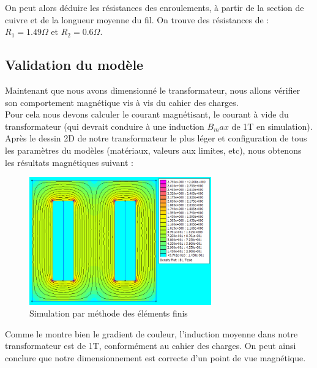 On peut alors déduire les résistances des enroulements, à partir de la section de cuivre et de la longueur moyenne du fil. On trouve des résistances de : $R_1 = 1.49\Omega$ et $R_2 = 0.6\Omega$.\\

\newpage
\subsection{Validation du modèle}
Maintenant que nous avons dimensionné le transformateur, nous allons vérifier son comportement magnétique vis à vis du cahier des charges.\\
Pour cela nous devons calculer le courant magnétisant, le courant à vide du transformateur (qui devrait conduire à une induction $B_max$ de 1T en simulation).\\

Après le dessin 2D de notre transformateur le plus léger et configuration de tous les paramètres du modèles (matériaux, valeurs aux limites, etc), nous obtenons les résultats magnétiques suivant :\\

\begin{figure}[h]
	\begin{center}
	\includegraphics[width=0.7\textwidth]{images/TP1_FEMM_validation}
	\caption{Simulation par méthode des éléments finis}\label{img:FEMMvalidation}
	\end{center}
\end{figure}
\FloatBarrier 

Comme le montre bien le gradient de couleur, l'induction moyenne dans notre transformateur est de 1T, conformément au cahier des charges. On peut ainsi conclure que notre dimensionnement est correcte d'un point de vue magnétique.\\